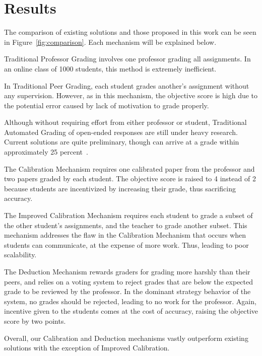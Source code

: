 \documentclass{sigchi}
\begin{document}
\section{Results}
The comparison of existing solutions and those proposed in this work can be seen in Figure~\ref{fig:comparison}. Each mechanism will be explained below.

Traditional Professor Grading involves one professor grading all assignments. In an online class of 1000 students, this method is extremely inefficient.

In Traditional Peer Grading, each student grades another's assignment without any supervision. However, as in this mechanism, the objective score is high due to the potential error caused by lack of motivation to grade properly.

Although without requiring effort from either professor or student, Traditional Automated Grading of open-ended responses are still under heavy research. Current solutions are quite preliminary, though can arrive at a grade within approximately 25 percent~\cite{automatedsystemssuck}.

The Calibration Mechanism requires one calibrated paper from the professor and two papers graded by each student. The objective score is raised to 4 instead of 2 because students are incentivized by increasing their grade, thus sacrificing accuracy.

The Improved Calibration Mechanism requires each student to grade a subset of the other student's assignments, and the teacher to grade another subset. This mechanism addresses the flaw in the Calibration Mechanism that occurs when students can communicate, at the expense of more work. Thus, leading to poor scalability.

The Deduction Mechanism rewards graders for grading more harshly than their peers, and relies on a voting system to reject grades that are below the expected grade to be reviewed by the professor. In the dominant strategy behavior of the system, no grades should be rejected, leading to no work for the professor. Again, incentive given to the students comes at the cost of accuracy, raising the objective score by two points.

Overall, our Calibration and Deduction mechanisms vastly outperform existing solutions with the exception of Improved Calibration.
\end{document}
